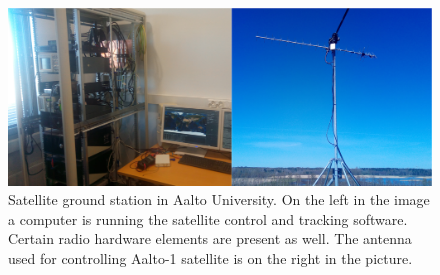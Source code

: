 \documentclass[english,12pt,a4paper,pdftex,elec,utf8]{aaltothesis}
\begin{document}
\begin{figure}[!h]
\centering
\includegraphics[scale=0.2]{groundstation}
\caption{Satellite ground station in Aalto University. On the left in the image a computer is running the satellite control and tracking software. Certain radio hardware elements are present as well. The antenna used for controlling Aalto-1 satellite is on the right in the picture.}
\label{aaltogs}
\end{figure}  
    
\end{document}
